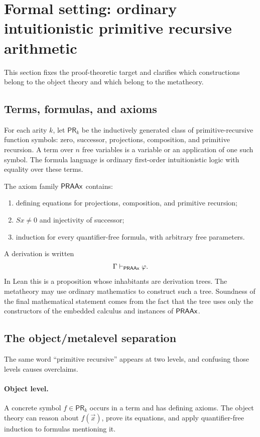 \section{Formal setting: ordinary intuitionistic primitive recursive arithmetic}
\label{sec:setting}

This section fixes the proof-theoretic target and clarifies which constructions
belong to the object theory and which belong to the metatheory.

\subsection{Terms, formulas, and axioms}

For each arity \(k\), let \(\mathsf{PR}_k\) be the inductively generated class
of primitive-recursive function symbols: zero, successor, projections,
composition, and primitive recursion.  A term over \(n\) free variables is a
variable or an application of one such symbol.  The formula language is
ordinary first-order intuitionistic logic with equality over these terms.

The axiom family \(\mathsf{PRAAx}\) contains:
\begin{enumerate}
  \item defining equations for projections, composition, and primitive
        recursion;
  \item \(Sx\ne 0\) and injectivity of successor;
  \item induction for every quantifier-free formula, with arbitrary free
        parameters.
\end{enumerate}
A derivation is written
\[
  \Gamma\vdash_{\mathsf{PRAAx}}\varphi.
\]
In Lean this is a proposition whose inhabitants are derivation trees.  The
metatheory may use ordinary mathematics to construct such a tree.  Soundness
of the final mathematical statement comes from the fact that the tree uses
only the constructors of the embedded calculus and instances of \(\mathsf{PRAAx}\).

\subsection{The object/metalevel separation}

The same word ``primitive recursive'' appears at two levels, and confusing
those levels causes overclaims.

\paragraph{Object level.}
A concrete symbol \(f\in\mathsf{PR}_k\) occurs in a term and has defining
axioms.  The object theory can reason about \(f(\vec x)\), prove its equations,
and apply quantifier-free induction to formulas mentioning it.

